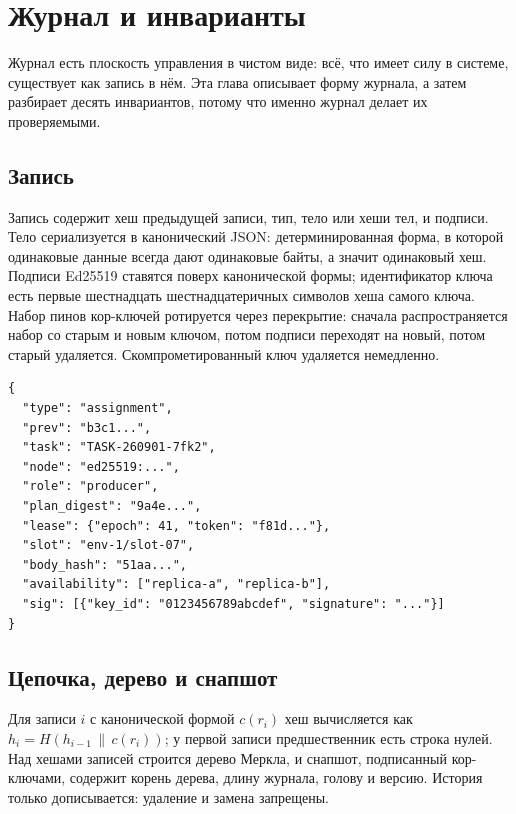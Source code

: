 \chapter{Журнал и инварианты}

Журнал есть плоскость управления в чистом виде: всё, что имеет силу в системе, существует как запись в нём. Эта глава описывает форму журнала, а затем разбирает десять инвариантов, потому что именно журнал делает их проверяемыми.

\section{Запись}

Запись содержит хеш предыдущей записи, тип, тело или хеши тел, и подписи. Тело сериализуется в канонический JSON: детерминированная форма, в которой одинаковые данные всегда дают одинаковые байты, а значит одинаковый хеш. Подписи Ed25519 ставятся поверх канонической формы; идентификатор ключа есть первые шестнадцать шестнадцатеричных символов хеша самого ключа. Набор пинов кор-ключей ротируется через перекрытие: сначала распространяется набор со старым и новым ключом, потом подписи переходят на новый, потом старый удаляется. Скомпрометированный ключ удаляется немедленно.

\begin{exbox}
\begin{lstlisting}
{
  "type": "assignment",
  "prev": "b3c1...",
  "task": "TASK-260901-7fk2",
  "node": "ed25519:...",
  "role": "producer",
  "plan_digest": "9a4e...",
  "lease": {"epoch": 41, "token": "f81d..."},
  "slot": "env-1/slot-07",
  "body_hash": "51aa...",
  "availability": ["replica-a", "replica-b"],
  "sig": [{"key_id": "0123456789abcdef", "signature": "..."}]
}
\end{lstlisting}
\end{exbox}

\section{Цепочка, дерево и снапшот}

Для записи $i$ с канонической формой $c(r_i)$ хеш вычисляется как $h_i = H(h_{i-1} \,\|\, c(r_i))$; у первой записи предшественник есть строка нулей. Над хешами записей строится дерево Меркла, и снапшот, подписанный кор-ключами, содержит корень дерева, длину журнала, голову и версию. История только дописывается: удаление и замена запрещены.

